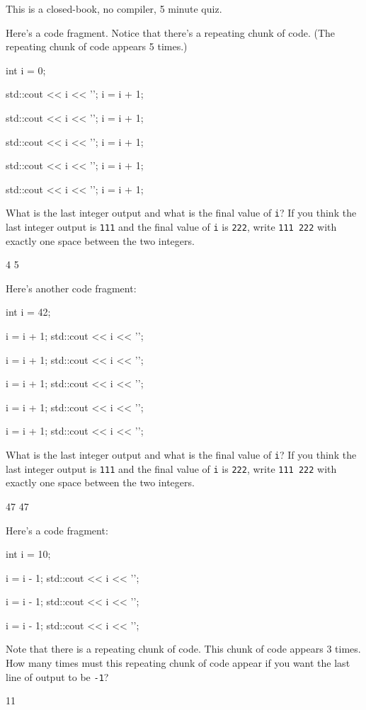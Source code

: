 

This is a closed-book, no compiler, 5 minute quiz.

\nextq
Here's a code fragment.
Notice that there's a repeating chunk of code.
(The repeating chunk of code appears 5 times.)
\begin{console}[commandchars=\@\{\},fontsize=\footnotesize]
int i = 0;

std::cout << i << '\n';
i = i + 1;

std::cout << i << '\n';
i = i + 1;

std::cout << i << '\n';
i = i + 1;

std::cout << i << '\n';
i = i + 1;

std::cout << i << '\n';
i = i + 1;
\end{console}
What is the last integer output and what is the final value of \verb!i!?
If you think the last integer output is \verb!111! and the final
value of \verb!i! is \verb!222!, write \verb!111 222! with
exactly one space between the two integers.
\\
\ANSWER
\begin{answercode}
4 5
\end{answercode}

\nextq
Here's another code fragment:
\begin{console}[commandchars=\@\{\},fontsize=\footnotesize]
int i = 42;

i = i + 1;
std::cout << i << '\n';

i = i + 1;
std::cout << i << '\n';

i = i + 1;
std::cout << i << '\n';

i = i + 1;
std::cout << i << '\n';

i = i + 1;
std::cout << i << '\n';
\end{console}
What is the last integer output and what is the final value of \verb!i!?
If you think the last integer output is \verb!111! and the final
value of \verb!i! is \verb!222!, write \verb!111 222! with
exactly one space between the two integers.
\\
\ANSWER
\begin{answercode}
47 47
\end{answercode}

\nextq
Here's a code fragment:
\begin{console}[commandchars=\@\{\},fontsize=\footnotesize]
int i = 10;

i = i - 1;
std::cout << i << '\n';

i = i - 1;
std::cout << i << '\n';

i = i - 1;
std::cout << i << '\n';
\end{console}
Note that there is a repeating chunk of code.
This chunk of code appears 3 times.
How many times must this repeating chunk of code appear
if you want the last line of output to be \verb!-1!?
\\
\ANSWER
\begin{answercode}
11
\end{answercode}

